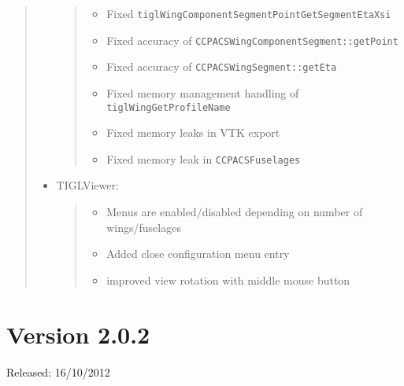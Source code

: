 \documentclass[]{scrartcl}
\begin{document}
\begin{quote}
\begin{itemize}
  \begin{quote}
  \begin{itemize}
  \itemsep1pt\parskip0pt
  \item
    Fixed \texttt{tiglWingComponentSegmentPointGetSegmentEtaXsi}
  \item
    Fixed accuracy of \texttt{CCPACSWingComponentSegment::getPoint}
  \item
    Fixed accuracy of \texttt{CCPACSWingSegment::getEta}
  \item
    Fixed memory management handling of \texttt{tiglWingGetProfileName}
  \item
    Fixed memory leaks in VTK export
  \item
    Fixed memory leak in \texttt{CCPACSFuselages}
  \end{itemize}
  \end{quote}
\item
  TIGLViewer:

  \begin{quote}
  \begin{itemize}
  \itemsep1pt\parskip0pt
  \item
    Menus are enabled/disabled depending on number of wings/fuselages
  \item
    Added close configuration menu entry
  \item
    improved view rotation with middle mouse button
  \end{itemize}
  \end{quote}
\end{itemize}
\end{quote}

\section{Version 2.0.2}

Released: 16/10/2012
\end{document}
